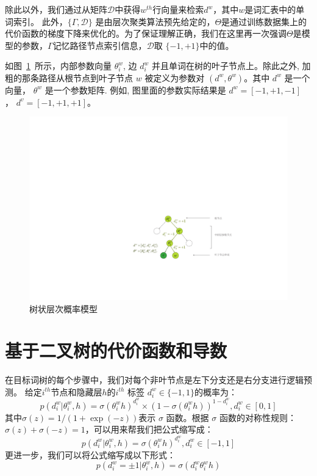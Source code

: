 除此以外，我们通过从矩阵$\mathcal{D}$中获得$w^{th} $行向量来检索$d^w$，其中$w$是词汇表中的单词索引。 此外，$\{\Gamma,\mathcal{D}\}$ 是由层次聚类算法预先给定的，$\Theta$是通过训练数据集上的代价函数的梯度下降来优化的。为了保证理解正确，我们在这里再一次强调$ \Theta $是模型的参数，$ \Gamma $记忆路径节点索引信息，$\mathcal {D}$取 $ \{ - 1,+1 \} $中的值。

如图~\ref{fig:tree_hsm}~所示，内部参数向量 $\theta_i^w$, 边 $d_i^w$ 并且单词在树的叶子节点上。除此之外, 加粗的那条路径从根节点到叶子节点 $w$ 被定义为参数对 $(d^w,\theta^w)$。其中 $d^w$ 是一个向量， $\theta^w$ 是一个参数矩阵. 例如, 图里面的参数实际结果是 $d^w=[-1,+1,-1]$ ， $d^{v}=[-1,+1,+1]$。
\begin{figure}[!h]
  \centering
    \includegraphics[width=0.85\linewidth]{./figures/thsm.pdf}
\caption{树状层次概率模型}\label{fig:tree_hsm} %
\end{figure}

\section{基于二叉树的代价函数和导数}
在目标词树的每个步骤中，我们对每个非叶节点是左下分支还是右分支进行逻辑预测。 给定$ i^{th} $节点和隐藏层$ h $的$ i^{th} $ 标签 $d^w_i\in \{-1,1\}$的概率为：
 \begin{equation}
p(d^w_i|\theta_{i}^w,h) =\sigma(\theta_{i}^w h)^{d_i^w}\times(1-\sigma(\theta_{i}^w h))^{1-{d_i^w}},d_i^w \in [0,1]
\end{equation}
其中$ \sigma(z)= 1 /(1 + \exp(-z))$表示 $\sigma$ 函数。根据 $\sigma$ 函数的对称性规则：$\sigma(z)+ \sigma(-z)=1 $，可以用来帮我们把公式缩写成：
 \begin{equation}
p(d^w_i|\theta_{i}^w,h) =\sigma(\theta_{i}^w h)^{d_i^w}, d_i^w \in [-1,1]
\end{equation}
更进一步，我们可以将公式缩写成以下形式：
\begin{equation}
p(d^w_i=\pm 1|\theta_{i}^w,h) = \sigma({d_i^w}\theta_{i}^w h)
\end{equation}



